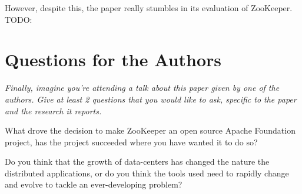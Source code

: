 \documentclass[11pt]{article}
\begin{document}
 However, despite this, the paper really stumbles in its evaluation of
 ZooKeeper. TODO:

\section*{Questions for the Authors}

\textsl{Finally, imagine you're attending a talk about this paper given by one
of the authors. Give at least 2 questions that you would like to ask, specific
to the paper and the research it reports.}

What drove the decision to make ZooKeeper an open source Apache Foundation
project, has the project succeeded where you have wanted it to do so?

Do you think that the growth of data-centers has changed the nature the
distributed applications, or do you think the tools used need to rapidly change
and evolve to tackle an ever-developing problem?




\end{document}
